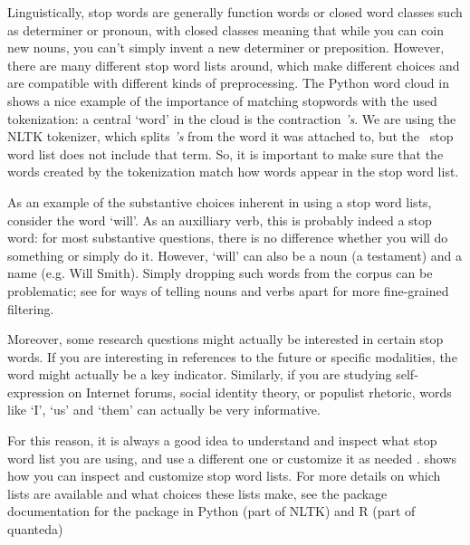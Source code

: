 Linguistically, stop words are generally function words or closed word classes such as determiner or pronoun,
with closed classes meaning that while you can coin new nouns, you can't simply invent a new determiner or preposition.
However, there are many different stop word lists around, which make different choices and are compatible with
different kinds of preprocessing.
The Python word cloud in  shows a nice example of the importance of matching stopwords with the used
tokenization: a central `word' in the cloud is the contraction \emph{'s}.
We are using the NLTK tokenizer, which splits \emph{'s} from the word it was attached to, but the \sklearn\ stop word list
does not include that term.
So, it is important to make sure that the words created by the tokenization match how words appear in the stop word list.

As an example of the substantive choices inherent in using a stop word lists,
consider the word `will'.
As an auxilliary verb, this is probably indeed a stop word: for most substantive questions, there is no difference
whether you will do something or simply do it.
However, `will' can also be a noun (a testament) and a name (e.g. Will Smith).
Simply dropping such words from the corpus can be problematic; see  for ways of telling nouns and verbs apart
for more fine-grained filtering.

Moreover, some research questions might actually be interested in certain stop words.
If you are interesting in references to the future or specific modalities,
the word might actually be a key indicator. 
Similarly, if you are studying self-expression on Internet forums, social identity theory, or populist rhetoric,
words like `I', `us' and `them' can actually be very informative.

For this reason, it is always a good idea to understand and inspect what stop word list you are using,
and use a different one or customize it as needed \citep[see also][]{nothman18}.
 shows how you can inspect and customize stop word lists.
For more details on which lists are available and what choices these lists make,
see the package documentation for the  package in Python (part of NLTK) and R (part of quanteda)




